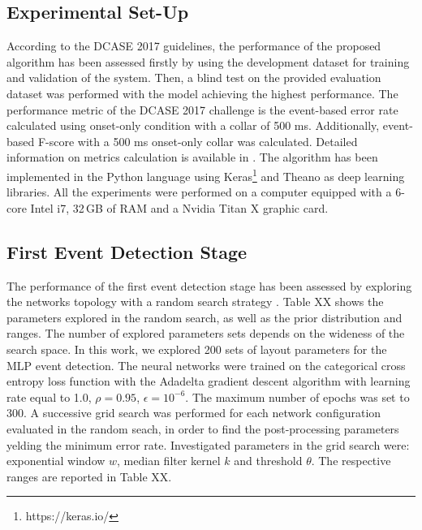 \documentclass{article}
\begin{document}
\begin{sloppy}
\section{Experimental Set-Up}
\label{sec:experiment}
According to the DCASE 2017 guidelines, the performance of the proposed algorithm has been assessed firstly by using the development dataset for training and validation of the system. Then, a blind test on the provided evaluation dataset was performed with the model achieving the highest performance. The performance metric of the DCASE 2017 challenge is the event-based error rate calculated using onset-only condition with a collar of 500 ms. Additionally, event-based F-score with a 500 ms onset-only collar was calculated. Detailed information on metrics calculation is available in \cite{Mesaros2016_MDPI}. The algorithm has been implemented in the Python language using Keras\footnote{https://keras.io/} and Theano \cite{Theano2016short} as deep learning libraries. All the experiments were performed on a computer equipped with a 6-core Intel i7, 32\,GB of RAM and a Nvidia Titan X graphic card.

\subsection{First Event Detection Stage}
The performance of the first event detection stage has been assessed by exploring the networks topology with a random search strategy \cite{bergstra2012random}. Table XX shows the parameters explored in the random search, as well as the prior distribution and ranges. The
number of explored parameters sets depends on the wideness of the search space. In this work, we explored 200 sets of layout parameters for the MLP event detection. The neural networks were trained on the categorical cross entropy loss function with the Adadelta gradient descent algorithm with learning rate equal to 1.0, $\rho=0.95$, $\epsilon=10^{-6}$. The maximum number of epochs was set to 300. A successive grid search was performed for each network configuration evaluated in the random seach, in order to find the post-processing parameters yelding the minimum error rate. Investigated parameters in the grid search were: exponential window $w$, median filter kernel $k$ and threshold $\theta$. The respective ranges are reported in Table XX.


\end{sloppy}
\end{document}
